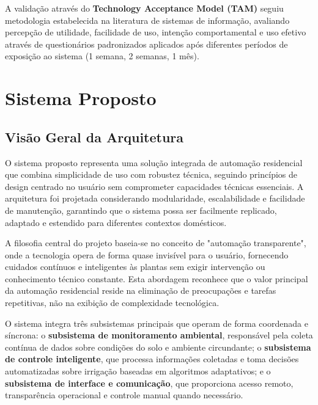 A validação através do \textbf{Technology Acceptance Model (TAM)} seguiu metodologia estabelecida na literatura de sistemas de informação, avaliando percepção de utilidade, facilidade de uso, intenção comportamental e uso efetivo através de questionários padronizados aplicados após diferentes períodos de exposição ao sistema (1 semana, 2 semanas, 1 mês).

\chapter{Sistema Proposto}

\section{Visão Geral da Arquitetura}

O sistema proposto representa uma solução integrada de automação residencial que combina simplicidade de uso com robustez técnica, seguindo princípios de design centrado no usuário sem comprometer capacidades técnicas essenciais. A arquitetura foi projetada considerando modularidade, escalabilidade e facilidade de manutenção, garantindo que o sistema possa ser facilmente replicado, adaptado e estendido para diferentes contextos domésticos.

A filosofia central do projeto baseia-se no conceito de "automação transparente", onde a tecnologia opera de forma quase invisível para o usuário, fornecendo cuidados contínuos e inteligentes às plantas sem exigir intervenção ou conhecimento técnico constante. Esta abordagem reconhece que o valor principal da automação residencial reside na eliminação de preocupações e tarefas repetitivas, não na exibição de complexidade tecnológica.


O sistema integra três subsistemas principais que operam de forma coordenada e síncrona: o \textbf{subsistema de monitoramento ambiental}, responsável pela coleta contínua de dados sobre condições do solo e ambiente circundante; o \textbf{subsistema de controle inteligente}, que processa informações coletadas e toma decisões automatizadas sobre irrigação baseadas em algoritmos adaptativos; e o \textbf{subsistema de interface e comunicação}, que proporciona acesso remoto, transparência operacional e controle manual quando necessário.


